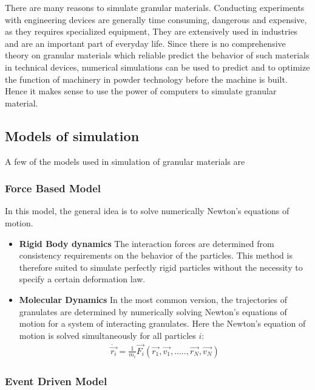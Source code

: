 There are many reasons to simulate granular materials. Conducting experiments with engineering devices are generally time consuming, dangerous and expensive, as they requires specialized equipment, They are extensively used in industries and are an important part of everyday life. Since there is no comprehensive theory on granular materials which reliable predict the behavior of such materials in technical devices, numerical simulations can be used to predict and to optimize the function of machinery in powder technology before the machine is built. Hence it makes sense to use the power of computers to simulate granular material.

\subsection{Models of simulation}

A few of the models used in simulation of granular materials are

\subsubsection{Force Based Model}

In this model, the general idea is to solve numerically Newton's equations of motion.
\begin{itemize}
\item \textbf{Rigid Body dynamics}
The interaction forces are determined from consistency requirements on the behavior of the particles. This method is therefore suited to simulate perfectly rigid particles without the necessity to specify a certain deformation law.

\item \textbf{Molecular Dynamics}
In the most common version, the trajectories of granulates are determined by numerically solving Newton's equations of motion for a system of interacting granulates. Here the Newton's equation of motion is solved simultaneously for all particles $i$:
\begin{align*}
\ddot{\vec{r_{i}}} = \frac{1}{m_{i}} \vec{F_{i}}(\vec{r_{1}}, \vec{v_{1}},.....,\vec{r_{N}},\vec{v_{N}})
\end{align*}

\end{itemize}

\subsubsection{Event Driven Model}

